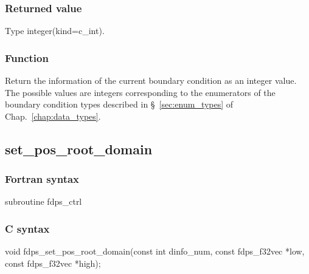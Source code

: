 \subsubsection*{Returned value}
Type integer(kind=c\_int).

\subsubsection*{Function}
Return the information of the current boundary condition as an integer value. The possible values are integers corresponding to the enumerators of the boundary condition types described in \S~\ref{sec:enum_types} of Chap.~\ref{chap:data_types}.

\clearpage

\subsection{set\_pos\_root\_domain}
\subsubsection*{Fortran syntax}
\begin{screen}
\begin{spverbatim}
subroutine fdps_ctrl%
\end{spverbatim}
\end{screen}

\subsubsection*{C syntax}
\begin{screen}
\begin{spverbatim}
void fdps_set_pos_root_domain(const int dinfo_num,
                              const fdps_f32vec *low,
                              const fdps_f32vec *high);
\end{spverbatim}
\end{screen}

